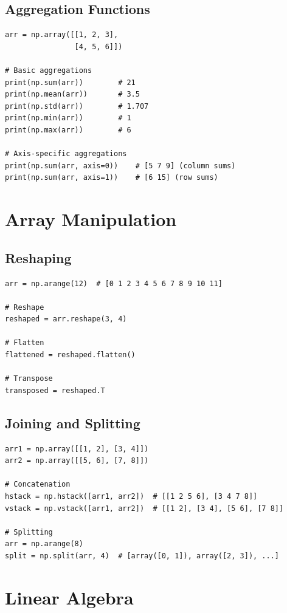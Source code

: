 \documentclass[12pt,a4paper]{article}
\begin{document}
\subsection{Aggregation Functions}

\begin{lstlisting}
arr = np.array([[1, 2, 3],
                [4, 5, 6]])

# Basic aggregations
print(np.sum(arr))        # 21
print(np.mean(arr))       # 3.5
print(np.std(arr))        # 1.707
print(np.min(arr))        # 1
print(np.max(arr))        # 6

# Axis-specific aggregations
print(np.sum(arr, axis=0))    # [5 7 9] (column sums)
print(np.sum(arr, axis=1))    # [6 15] (row sums)
\end{lstlisting}

\section{Array Manipulation}

\subsection{Reshaping}

\begin{lstlisting}
arr = np.arange(12)  # [0 1 2 3 4 5 6 7 8 9 10 11]

# Reshape
reshaped = arr.reshape(3, 4)

# Flatten
flattened = reshaped.flatten()

# Transpose
transposed = reshaped.T
\end{lstlisting}

\subsection{Joining and Splitting}

\begin{lstlisting}
arr1 = np.array([[1, 2], [3, 4]])
arr2 = np.array([[5, 6], [7, 8]])

# Concatenation
hstack = np.hstack([arr1, arr2])  # [[1 2 5 6], [3 4 7 8]]
vstack = np.vstack([arr1, arr2])  # [[1 2], [3 4], [5 6], [7 8]]

# Splitting
arr = np.arange(8)
split = np.split(arr, 4)  # [array([0, 1]), array([2, 3]), ...]
\end{lstlisting}

\section{Linear Algebra}
\end{document}
